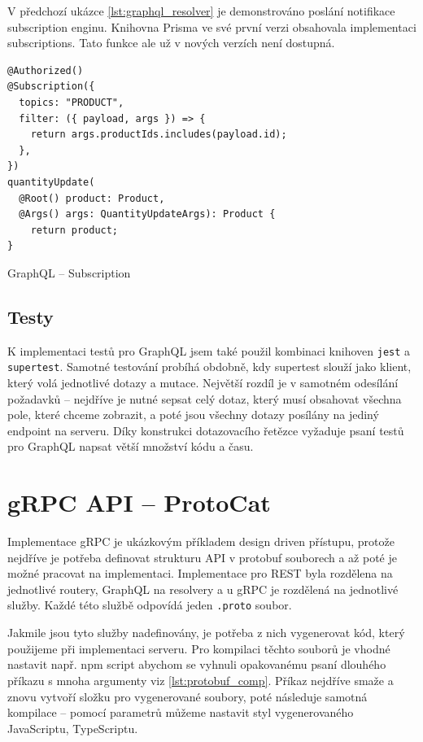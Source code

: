 \documentclass[thesis=M,czech]{FITthesis}[2019/12/23]
\begin{document}
V předchozí ukázce \ref{lst:graphql_resolver} je demonstrováno poslání notifikace subscription enginu. Knihovna Prisma ve své první verzi obsahovala implementaci subscriptions. Tato funkce ale už v nových verzích není dostupná.

\begin{listing}[H]
\begin{verbatim}
@Authorized()
@Subscription({
  topics: "PRODUCT",
  filter: ({ payload, args }) => {
    return args.productIds.includes(payload.id);
  },
})
quantityUpdate(
  @Root() product: Product,
  @Args() args: QuantityUpdateArgs): Product {
    return product;
}
\end{verbatim}
\caption{GraphQL -- Subscription}
\label{lst:graphql_subscription}
\end{listing}

\subsection{Testy}
K implementaci testů pro GraphQL jsem také použil kombinaci knihoven \texttt{jest} a \texttt{supertest}. Samotné testování probíhá obdobně, kdy supertest slouží jako klient, který volá jednotlivé dotazy a mutace. Největší rozdíl je v samotném odesílání požadavků -- nejdříve je nutné sepsat celý dotaz, který musí obsahovat všechna pole, které chceme zobrazit, a poté jsou všechny dotazy posílány na jediný endpoint na serveru. Díky konstrukci dotazovacího řetězce vyžaduje psaní testů pro GraphQL napsat větší množství kódu a času.

\section{gRPC API -- ProtoCat}
Implementace gRPC je ukázkovým příkladem design driven přístupu, protože nejdříve je potřeba definovat strukturu API v protobuf souborech a až poté je možné pracovat na implementaci. Implementace pro REST byla rozdělena na jednotlivé routery, GraphQL na resolvery a u gRPC je rozdělená na jednotlivé služby. Každé této službě odpovídá jeden \texttt{.proto} soubor.

Jakmile jsou tyto služby nadefinovány, je potřeba z nich vygenerovat kód, který použijeme při implementaci serveru. Pro kompilaci těchto souborů je vhodné nastavit např. npm script abychom se vyhnuli opakovanému psaní dlouhého příkazu s mnoha argumenty viz \ref{lst:protobuf_comp}. Příkaz nejdříve smaže a znovu vytvoří složku pro vygenerované soubory, poté následuje samotná kompilace -- pomocí parametrů můžeme nastavit styl vygenerovaného JavaScriptu, TypeScriptu.
\end{document}
